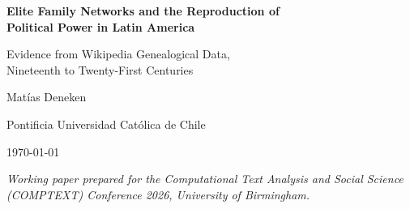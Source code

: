 \begingroup
\thispagestyle{empty}
\begin{center}
\vspace*{0.4cm}
{\LARGE\bfseries Elite Family Networks and the Reproduction of\\ Political Power in Latin America\par}
\vspace{0.75em}
{\large Evidence from Wikipedia Genealogical Data,\\ Nineteenth to Twenty-First Centuries\par}
\vspace{2em}
{\large Matías Deneken\par}
\vspace{0.35em}
{\normalsize Pontificia Universidad Católica de Chile\par}
\vspace{1.1em}
{\normalsize \today\par}
\vspace{1.2em}
{\small\itshape Working paper prepared for the Computational Text Analysis and Social Science (COMPTEXT) Conference 2026, University of Birmingham.\par}
\end{center}
\vspace{0.8cm}

